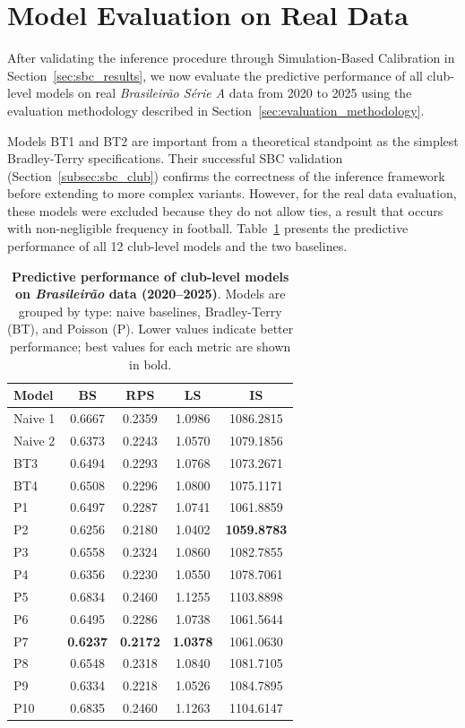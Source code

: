 \section{Model Evaluation on Real Data}
\label{sec:real_data}

After validating the inference procedure through Simulation-Based Calibration in Section~\ref{sec:sbc_results}, we now evaluate the predictive performance of all club-level models on real \textit{Brasileirão Série A} data from 2020 to 2025 using the evaluation methodology described in Section~\ref{sec:evaluation_methodology}.

Models BT1 and BT2 are important from a theoretical standpoint as the simplest Bradley-Terry specifications.
Their successful SBC validation (Section~\ref{subsec:sbc_club}) confirms the correctness of the inference framework before extending to more complex variants.
However, for the real data evaluation, these models were excluded because they do not allow ties, a result that occurs with non-negligible frequency in football.
Table~\ref{tab:club_metrics} presents the predictive performance of all 12 club-level models and the two baselines.

\begin{table}[htbp]
    \centering
    \begin{tabular}{lcccc}
        \toprule
        Model & BS & RPS & LS & IS \\
        \midrule
        Naive 1 & 0.6667 & 0.2359 & 1.0986 & 1086.2815 \\
        Naive 2 & 0.6373 & 0.2243 & 1.0570 & 1079.1856 \\
        \midrule
        BT3 & 0.6494 & 0.2293 & 1.0768 & 1073.2671 \\
        BT4 & 0.6508 & 0.2296 & 1.0800 & 1075.1171 \\
        \midrule
        P1  & 0.6497 & 0.2287 & 1.0741 & 1061.8859 \\
        P2  & 0.6256 & 0.2180 & 1.0402 & \textbf{1059.8783} \\
        P3  & 0.6558 & 0.2324 & 1.0860 & 1082.7855 \\
        P4  & 0.6356 & 0.2230 & 1.0550 & 1078.7061 \\
        P5  & 0.6834 & 0.2460 & 1.1255 & 1103.8898 \\
        P6  & 0.6495 & 0.2286 & 1.0738 & 1061.5644 \\
        P7  & \textbf{0.6237} & \textbf{0.2172} & \textbf{1.0378} & 1061.0630 \\
        P8  & 0.6548 & 0.2318 & 1.0840 & 1081.7105 \\
        P9  & 0.6334 & 0.2218 & 1.0526 & 1084.7895 \\
        P10 & 0.6835 & 0.2460 & 1.1263 & 1104.6147 \\
        \bottomrule
    \end{tabular}
    \caption{
        \textbf{Predictive performance of club-level models on \textit{Brasileirão} data (2020--2025)}.
        Models are grouped by type: naive baselines, Bradley-Terry (BT), and Poisson (P).
        Lower values indicate better performance; best values for each metric are shown in bold.
    }
    \label{tab:club_metrics}
\end{table}


